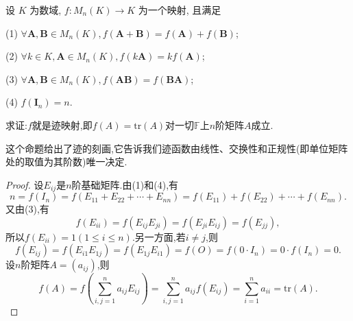 \documentclass[../../main.tex]{subfiles}
\begin{document}
\begin{theorem}[矩阵迹的刻画]\label{theorem:矩阵迹的刻画}
设 \( K \) 为数域, \( f: M_n(K) \to K \) 为一个映射, 且满足

(1) \( \forall \boldsymbol{A}, \boldsymbol{B} \in M_n(K), f(\boldsymbol{A} + \boldsymbol{B}) = f(\boldsymbol{A}) + f(\boldsymbol{B}) \);

(2) \( \forall k \in K, \boldsymbol{A} \in M_n(K), f(k\boldsymbol{A}) = kf(\boldsymbol{A}) \);

(3) \( \forall \boldsymbol{A}, \boldsymbol{B} \in M_n(K), f(\boldsymbol{AB}) = f(\boldsymbol{BA}) \);

(4) \( f(\boldsymbol{I}_n) = n \).

求证:\(f\)就是迹映射,即\(f(A)=\mathrm{tr}(A)\)对一切\(\mathbb{F}\)上\(n\)阶矩阵\(A\)成立.
\end{theorem}
\begin{note}
这个命题给出了迹的刻画,它告诉我们迹函数由线性、交换性和正规性(即单位矩阵处的取值为其阶数)唯一决定.
\end{note}
\begin{proof}
设\(E_{ij}\)是\(n\)阶基础矩阵.由(1)和(4),有
\[
n = f(I_n)=f(E_{11}+E_{22}+\cdots+E_{nn})=f(E_{11})+f(E_{22})+\cdots+f(E_{nn}).
\]
又由(3),有
\[
f(E_{ii})=f(E_{ij}E_{ji})=f(E_{ji}E_{ij})=f(E_{jj}),
\]
所以\(f(E_{ii}) = 1(1\leqslant  i\leqslant  n)\).另一方面,若\(i\neq j\),则
\[
f(E_{ij})=f(E_{i1}E_{1j})=f(E_{1j}E_{i1})=f(O)=f(0\cdot I_n)=0\cdot f(I_n)=0.
\]
设\(n\)阶矩阵\(A=(a_{ij})\),则
\[
f(A)=f\left(\sum_{i,j = 1}^{n}a_{ij}E_{ij}\right)=\sum_{i,j = 1}^{n}a_{ij}f(E_{ij})=\sum_{i = 1}^{n}a_{ii}=\mathrm{tr}(A).
\]

\end{proof}
\end{document}
